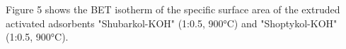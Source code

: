 
Figure 5 shows the BET isotherm of the specific surface area of the
extruded activated adsorbents "Shubarkol-KOH" (1:0.5, 900°C) and
"Shoptykol-KOH" (1:0.5, 900°C).

